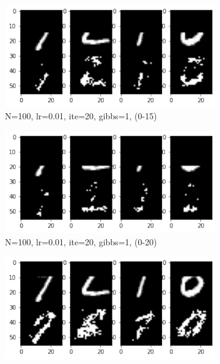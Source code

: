 \documentclass{article}
\begin{document}
\begin{figure}[h!]
     \hfill
     \begin{subfigure}[b]{0.3\textwidth}
         \centering
         \includegraphics[width=\textwidth]{lab4/100_0.01_20_1_0-15.pdf}
         \caption{N=100, lr=0.01, ite=20, gibbs=1, (0-15)}
         \label{fig:noise10ite100}
     \end{subfigure}
     \hfill
     \begin{subfigure}[b]{0.3\textwidth}
         \centering
         \includegraphics[width=\textwidth]{lab4/100_0.01_20_1_0-20.pdf}
         \caption{N=100, lr=0.01, ite=20, gibbs=1, (0-20)}
         \label{fig:noise10ite500}
     \end{subfigure}
     \begin{subfigure}[b]{0.3\textwidth}
         \centering
         \includegraphics[width=\textwidth]{lab4/50_0.01_20_10_10-20.pdf}

\end{subfigure}
\end{figure}
\end{document}
